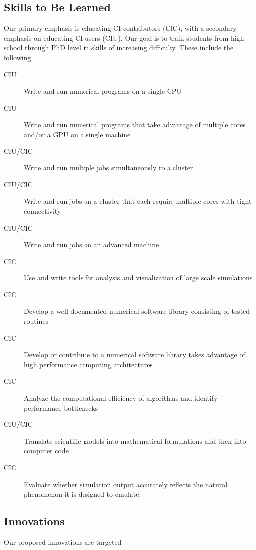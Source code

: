 \documentclass[11pt]{NSFamsart}
\begin{document}
\subsection{Skills to Be Learned}
Our primary emphasis is educating CI contributors (CIC), with a secondary emphasis on educating CI users (CIU).  Our goal is to train students from high school through PhD level in skills of increasing difficulty.  These include the following

\begin{description}
\item[CIU] Write and run numerical programs on a single CPU 
\item[CIU] Write and run numerical programs that take advantage of multiple cores and/or a GPU on a single machine 
\item[CIU/CIC] Write and run multiple jobs simultaneously to a cluster
\item[CIU/CIC] Write and run jobs on a cluster that each require multiple cores with tight connectivity
\item[CIU/CIC] Write and run jobs on an advanced machine 
\item[CIC] Use and write tools for analysis and visualization of large scale simulations
\item[CIC] Develop a well-documented numerical software library consisting of tested routines
\item[CIC] Develop or contribute to a numerical software library takes advantage of high performance computing architectures
\item[CIC] Analyze the computational efficiency of algorithms and identify performance bottlenecks
\item[CIU/CIC] Translate scientific models into mathematical formulations and then into computer code
\item[CIC] Evaluate whether simulation output accurately reflects the natural phenomenon it is designed to emulate.  


\end{description}






\subsection{Innovations}
Our proposed innovations are targeted 
\end{document}
